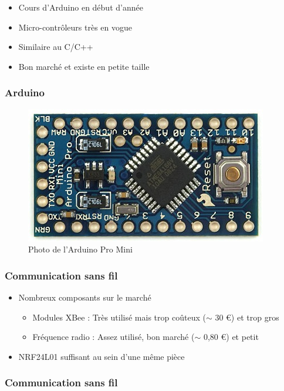 \documentclass{beamer}
\begin{document}
{\begin{frame}
	  \begin{itemize}
	    \item Cours d'Arduino en début d'année
	    \item Micro-contrôleurs très en vogue
	    \item Similaire au C/C++
	    \item Bon marché et existe en petite taille
	  \end{itemize}
	\end{frame}
	
	\begin{frame}
	  \frametitle{Arduino}
	  
	  \begin{figure}[htbp]
	    \centering
	    \includegraphics[scale=0.2]{img/arduinopromini.jpg}
	    \caption{Photo de l'Arduino Pro Mini}
	  \end{figure} 
	\end{frame}
	
	\begin{frame} %
	  \frametitle{Communication sans fil}
	
	  \begin{itemize}
	    \item Nombreux composants sur le marché
	    \begin{itemize}
	      \item Modules XBee : Très utilisé mais trop coûteux ($\sim$ 30 
\euro) et trop gros
	      \item Fréquence radio : Assez utilisé, bon marché ($\sim$ 0,80 
\euro) et petit
	    \end{itemize}
	    \item NRF24L01 suffisant au sein d'une même pièce
	  \end{itemize}
	\end{frame}
	
	\begin{frame}
	  \frametitle{Communication sans fil}
	

\end{frame}}
\end{document}
